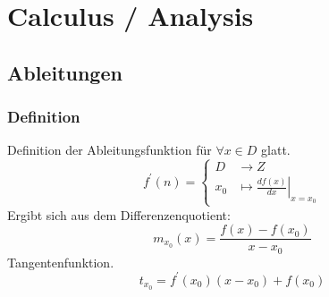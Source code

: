 \documentclass[../Main.tex]{subfiles}
\begin{document}
\chapter{Calculus / Analysis}

\intro{

}

\section{Ableitungen}
\subsection{Definition}
Definition der Ableitungsfunktion für \(\forall x \in D\) glatt.
\begin{equation}
    f^{'}(n) =
  \begin{cases}
    D       &\rightarrow Z\\
    x_0       &\mapsto \left.\frac{d f(x)}{dx}\right|_{x=x_0}
  \end{cases}
\end{equation}
Ergibt sich aus dem Differenzenquotient:
\begin{equation}
    m_{x_0}(x) = \frac{f(x)-f(x_0)}{x-x_0} 
\end{equation}
Tangentenfunktion.
\begin{equation}
    t_{x_0} = f^{'}(x_0)(x-x_0)+f(x_0)
\end{equation}
\end{document}
